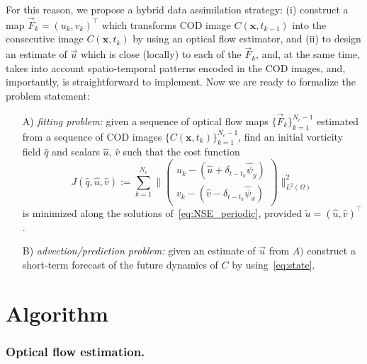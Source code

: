 \documentclass[onecolumn, 12pt, conference]{ieeeconf}
\def\F{\vec{F}}
\newcommand{\Lt}{L^2(\Omega)}
\renewcommand{\u}{\vec{u}}
\begin{document}
For this reason, we propose a hybrid data assimilation strategy: (i) construct a map $\F_k=(u_k,v_k)^\top$ which transforms COD image $C(\bm{x},t_{k-1})$ into the consecutive image $C(\bm{x},t_{k})$ by using an optical flow estimator, and (ii) to design an estimate of $\u$ which is close (locally) to each of the $\F_k$, and, at the same time, takes into account spatio-temporal patterns encoded in the COD images, and, importantly, is straightforward to implement. Now we are ready to formalize the problem statement:
\begin{itemize}
\item [A)] \emph{fitting problem:} given a sequence of optical flow maps $\{\F_k\}_{k=1}^{N_c-1}$ estimated from a sequence of COD images $\{C(\bm{x},t_k)\}_{k=1}^{N_c-1}$, find an initial vorticity field $\hat q$ and scalars $\hat u$, $\hat v$ such that the cost function
\begin{equation}
  \label{eq:OptContPr_1}
    J(\hat q,\hat u,\hat v):=\sum_{k=1}^{N_c} \|\left(
      \begin{smallmatrix}
        u_k - (\hat u +
    \delta_{t-t_k}\hat\psi_y)\\
    v_k -(\hat v -\delta_{t-t_k}\hat\psi_x)
      \end{smallmatrix}\right)\|^2_{\Lt}
  \end{equation}
is minimized along the solutions of~\eqref{eq:NSE_periodic}, provided $\tilde u=(\hat u,\hat v)^\top$.
\item [B)] \emph{advection/prediction problem:} given an estimate of $\u$ from $A)$ construct a short-term forecast of the future dynamics of $C$ by using~\eqref{eq:state}.
\end{itemize}
\section{Algorithm}
\label{sec:algorithm}

\subsubsection{Optical flow estimation.}
\label{sec:optflow}
\end{document}
